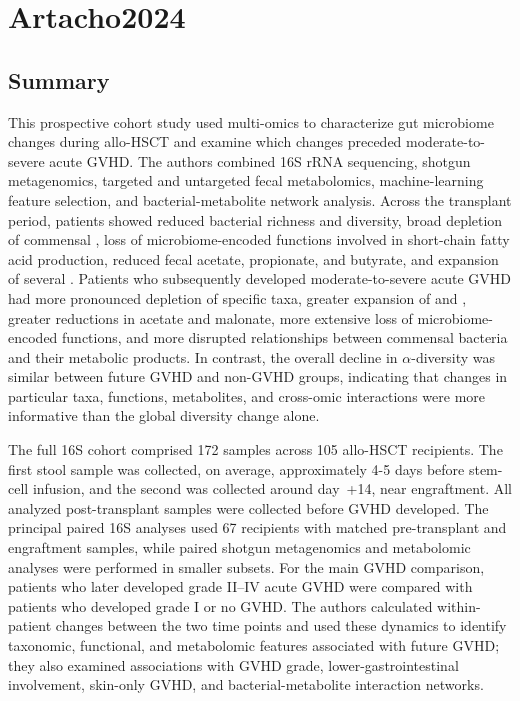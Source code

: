 \documentclass[11pt,a4paper]{article}
\begin{document}
\FloatBarrier
\newpage

\section{Artacho2024}
\subsection{Summary}
This prospective cohort study used multi-omics to characterize gut microbiome changes during allo-HSCT and examine which changes preceded moderate-to-severe acute GVHD. The authors combined 16S rRNA sequencing, shotgun metagenomics, targeted and untargeted fecal metabolomics, machine-learning feature selection, and bacterial-metabolite network analysis. Across the transplant period, patients showed reduced bacterial richness and diversity, broad depletion of commensal \taxClostridiales, loss of microbiome-encoded functions involved in short-chain fatty acid production, reduced fecal acetate, propionate, and butyrate, and expansion of several \taxStaphylococcusSpecies. Patients who subsequently developed moderate-to-severe acute GVHD had more pronounced depletion of specific \taxClostridiales taxa, greater expansion of \taxEnterococcusFaecium and \taxParabacteroides, greater reductions in acetate and malonate, more extensive loss of microbiome-encoded functions, and more disrupted relationships between commensal bacteria and their metabolic products. In contrast, the overall decline in $\alpha$-diversity was similar between future GVHD and non-GVHD groups, indicating that changes in particular taxa, functions, metabolites, and cross-omic interactions were more informative than the global diversity change alone.
\par

The full 16S cohort comprised 172 samples across 105 allo-HSCT recipients. The first stool sample was collected, on average, approximately 4-5 days before stem-cell infusion, and the second was collected around day~+14, near engraftment. All analyzed post-transplant samples were collected before GVHD developed. The principal paired 16S analyses used 67 recipients with matched pre-transplant and engraftment samples, while paired shotgun metagenomics and metabolomic analyses were performed in smaller subsets. For the main GVHD comparison, patients who later developed grade II--IV acute GVHD were compared with patients who developed grade I or no GVHD. The authors calculated within-patient changes between the two time points and used these dynamics to identify taxonomic, functional, and metabolomic features associated with future GVHD; they also examined associations with GVHD grade, lower-gastrointestinal involvement, skin-only GVHD, and bacterial-metabolite interaction networks.
\par
\end{document}
